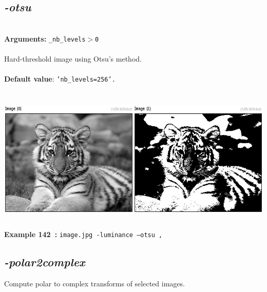 \documentclass[a4paper,11pt,twoside]{book}
\begin{document}
\subsection{\emph{-otsu} }\vspace*{-0.5em}
~\\\textbf{Arguments: } 
{\small \texttt{\_nb\_levels$>$0}}\\~\\
Hard-threshold image using Otsu's method.
~\\~\\\textbf{Default value}: {\small \texttt{'nb\_levels=256'.}}
\begin{center}\includegraphics[keepaspectratio=true,height=7cm,width=\textwidth]{img/gmic_def142.jpg}\\
{\footnotesize \textbf{Example 142~:} \texttt{image.jpg -luminance --otsu ,}}
\end{center}

\subsection{\emph{-polar2complex} }\vspace*{-0.5em}
Compute polar to complex transforms of selected images.
\end{document}
